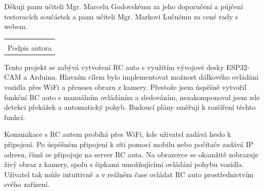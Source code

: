 \documentclass[12pt, a4paper,
oneside,      %
openany
]{report}
\newcommand\datumOdevzdani{1. 1. 2024} %
\begin{document}
	
	\noindent Děkuji panu učiteli Mgr. Marcelu 
Godovskému za jeho doporučení a půjčení testovacích součástek a panu učiteli Mgr. Markovi Lučnému za cené rady s webem.
	
	\vspace*{0.6\textheight} %

	\vfill
	\noindent{V Opavě \datumOdevzdani\\}
	\noindent
	\begin{minipage}{\linewidth}
		\hspace{7.5cm} 
		\begin{tabular}{@{}p{6cm}@{}}
			\dotfill \\
		Podpis autora
		\end{tabular}
	\end{minipage}
	
	\clearpage %

	\noindent Tento projekt se zabývá vytvoření RC auta s využitím vývojové desky ESP32-CAM a Arduina. Hlavním cílem bylo implementovat možnost dálkového ovládání vozidla přes WiFi a přenosu obrazu z kamery. Přestože jsem úspěšně vytvořil funkční RC auto s manuálním ovládáním a sledováním, nezakomponoval jsem zde detekci překážek a automatický pohyb. Budoucí plány směřují k rozšíření těchto funkcí.
 
  \noindent Komunikace s RC autem probíhá přes WiFi, kde uživatel zadává heslo k připojení. Po úspěšném připojení k síti pomocí mobilu nebo počítače zadává IP adresu, čímž se připojuje na server RC auta. Na obrazovce se okamžitě zobrazuje živý obraz z kamery, spolu s šipkami umožňujícími ovládání pohybu vozidla. Uživatel tak může intuitivně a v reálném čase ovládat RC auto prostřednictvím svého zařízení.
	
\end{document}
